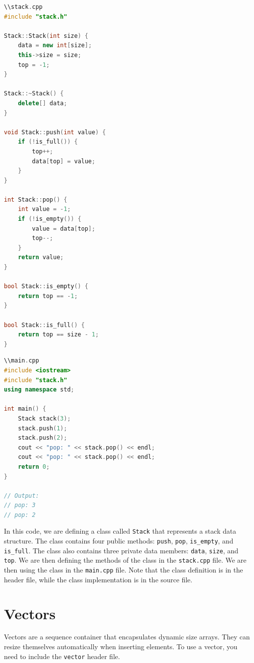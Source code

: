 \begin{lstlisting}[language=C++]
\\stack.cpp
#include "stack.h"

Stack::Stack(int size) {
    data = new int[size];
    this->size = size;
    top = -1;
}

Stack::~Stack() {
    delete[] data;
}

void Stack::push(int value) {
    if (!is_full()) {
        top++;
        data[top] = value;
    }
}

int Stack::pop() {
    int value = -1;
    if (!is_empty()) {
        value = data[top];
        top--;
    }
    return value;
}

bool Stack::is_empty() {
    return top == -1;
}

bool Stack::is_full() {
    return top == size - 1;
}
\end{lstlisting}

\begin{lstlisting}[language=C++]
\\main.cpp
#include <iostream>
#include "stack.h"
using namespace std;

int main() {
    Stack stack(3);
    stack.push(1);
    stack.push(2);
    cout << "pop: " << stack.pop() << endl;
    cout << "pop: " << stack.pop() << endl;
    return 0;
}

// Output:
// pop: 3
// pop: 2
\end{lstlisting}

In this code, we are defining a class called \texttt{Stack} that represents a stack data structure. The class contains
four public methods: \texttt{push}, \texttt{pop}, \texttt{is\_empty}, and \texttt{is\_full}. The class also contains
three private data members: \texttt{data}, \texttt{size}, and \texttt{top}. We are then defining the methods of the
class in the \texttt{stack.cpp} file. We are then using the class in the \texttt{main.cpp} file. Note that the class
definition is in the header file, while the class implementation is in the source file.\\

\section{Vectors}

Vectors are a sequence container that encapsulates dynamic size arrays. They can resize themselves automatically when
inserting elements. To use a vector, you need to include the \texttt{vector} header file.\\

